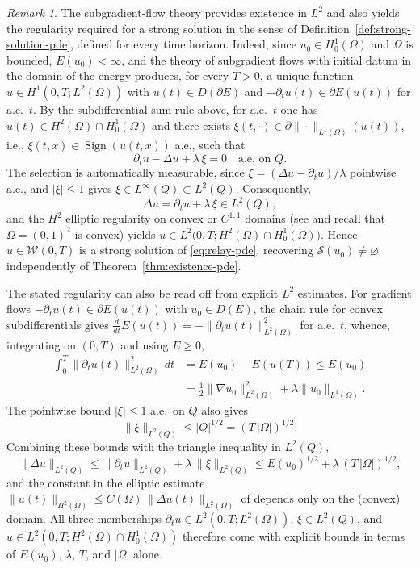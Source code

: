 \documentclass[11pt]{elsarticle}
\theoremstyle{definition}
\theoremstyle{remark}
\newtheorem{remark}[theorem]{Remark}
\numberwithin{equation}{section}
\DeclareMathOperator{\Sign}{Sign}
\begin{document}
\begin{remark}
	The subgradient-flow theory provides existence in $L^2$ and also yields
	the regularity required for a strong solution in the sense of
	Definition~\ref{def:strong-solution-pde}, defined for every time
	horizon. Indeed, since $u_0\in H_0^1(\Omega)$ and $\Omega$ is bounded,
	$E(u_0)<\infty$, and the theory of subgradient flows with initial datum
	in the domain of the energy \cite{Brezis1973} produces, for every
	$T>0$, a unique function $u\in H^1(0,T;L^2(\Omega))$ with
	$u(t)\in D(\partial E)$ and
	$-\partial_tu(t)\in\partial E(u(t))$ for a.e.\ $t$. By the
	subdifferential sum rule above, for a.e.\ $t$ one has
	$u(t)\in H^2(\Omega)\cap H_0^1(\Omega)$ and there exists
	$\xi(t,\cdot)\in\partial\|\cdot\|_{L^1(\Omega)}(u(t))$, i.e.,
	$\xi(t,x)\in\Sign(u(t,x))$ a.e., such that
	\[
	\partial_tu-\Delta u+\lambda\,\xi=0
	\quad\text{a.e.\ on }Q.
	\]
	The selection is automatically measurable, since
	$\xi=(\Delta u-\partial_tu)/\lambda$ pointwise a.e., and
	$|\xi|\le1$ gives $\xi\in L^\infty(Q)\subset L^2(Q)$. Consequently,
	\[
	\Delta u=\partial_tu+\lambda\,\xi\in L^2(Q),
	\]
	and the $H^2$ elliptic regularity on convex or $C^{1,1}$ domains
	(see \cite[Theorem~3.2.1.2]{Grisvard1985} and recall that $\Omega=(0,1)^2$ is
	convex) yields
	$u\in L^2\bigl(0,T;H^2(\Omega)\cap H_0^1(\Omega)\bigr)$. Hence
	$u\in\mathcal{W}(0,T)$ is a strong solution of
	\eqref{eq:relay-pde}, recovering $\mathcal{S}(u_0)\neq\varnothing$
	independently of Theorem~\ref{thm:existence-pde}.
	
	The stated regularity can also be read off from explicit $L^2$ estimates.
	For gradient flows
	$-\partial_tu(t)\in\partial E(u(t))$ with $u_0\in D(E)$, the chain
	rule for convex subdifferentials \cite[Lemme~3.3]{Brezis1973} gives
	$\frac{d}{dt}E(u(t))=-\|\partial_tu(t)\|_{L^2(\Omega)}^2$ for a.e.\
	$t$, whence, integrating on $(0,T)$ and using $E\ge0$,
	\begin{align*}
	\int_0^T\|\partial_tu(t)\|_{L^2(\Omega)}^2\,dt
	& = E(u_0)-E(u(T))
	\le E(u_0)
	\\ &	
	= \tfrac12\|\nabla u_0\|_{L^2(\Omega)}^2
	+\lambda\|u_0\|_{L^1(\Omega)}.
	\end{align*}
	The pointwise bound $|\xi|\le1$ a.e.\ on $Q$ also gives
	\[
	\|\xi\|_{L^2(Q)}\le|Q|^{1/2}=(T\,|\Omega|)^{1/2}.
	\]
	Combining these bounds with the triangle inequality in $L^2(Q)$,
	\[
	\|\Delta u\|_{L^2(Q)}
	\le\|\partial_tu\|_{L^2(Q)}+\lambda\,\|\xi\|_{L^2(Q)}
	\le E(u_0)^{1/2}+\lambda\,(T\,|\Omega|)^{1/2},
	\]
	and the constant in the elliptic estimate
	$\|u(t)\|_{H^2(\Omega)}\le C(\Omega)\,\|\Delta u(t)\|_{L^2(\Omega)}$
	of \cite[Theorem~3.2.1.2]{Grisvard1985} depends only on the (convex)
	domain. All three memberships
	$\partial_tu\in L^2(0,T;L^2(\Omega))$, $\xi\in L^2(Q)$, and
	$u\in L^2(0,T;H^2(\Omega)\cap H_0^1(\Omega))$ therefore come with
	explicit bounds in terms of $E(u_0)$, $\lambda$, $T$, and $|\Omega|$
	alone.
	

\end{remark}
\end{document}
